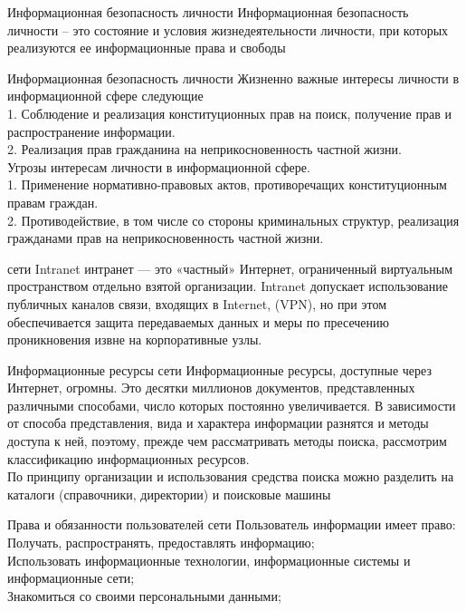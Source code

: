 \documentclass{beamer}
\begin{document}
\begin{frame}{Информационная безопасность личности}
    Информационная безопасность личности – это состояние и условия жизнедеятельности личности, при которых реализуются ее информационные права и свободы
\end{frame}

\begin{frame}{Информационная безопасность личности}
    Жизненно важные интересы личности в информационной сфере следующие\\
1. Соблюдение и реализация конституционных прав на поиск, получение прав и
распространение информации.\\
2. Реализация прав гражданина на неприкосновенность частной жизни.\\
Угрозы интересам личности в информационной сфере.\\
1. Применение нормативно-правовых актов, противоречащих конституционным правам граждан.\\
2. Противодействие, в том числе со стороны криминальных структур, реализация гражданами прав на неприкосновенность частной жизни.
\end{frame}

\begin{frame}{сети Intranet}
    интранет — это «частный» Интернет, ограниченный виртуальным пространством отдельно взятой организации. Intranet допускает использование публичных каналов связи, входящих в Internet, (VPN), но при этом обеспечивается защита передаваемых данных и меры по пресечению проникновения извне на корпоративные узлы. 
\end{frame}


\begin{frame}{Информационные ресурсы сети}
    Информационные ресурсы, доступные через Интернет, огромны. Это десятки миллионов документов, представленных различными способами, число которых постоянно увеличивается. В зависимости от способа представления, вида и характера информации разнятся и методы доступа к ней, поэтому, прежде чем рассматривать методы поиска, рассмотрим классификацию информационных ресурсов.\\
    
    По принципу организации и использования средства поиска можно разделить на каталоги (справочники, директории) и поисковые машины  
\end{frame}


\begin{frame}{Права и обязанности пользователей сети}
Пользователь информации имеет право:\\
Получать, распространять, предоставлять информацию;\\
Использовать информационные технологии, информационные системы и информационные сети;\\
Знакомиться со своими персональными данными;\\
\end{frame}
\end{document}
